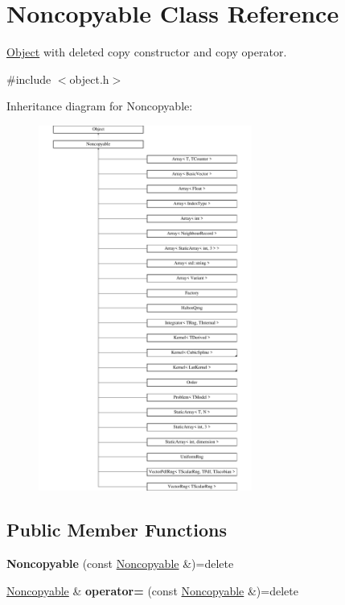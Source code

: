 \hypertarget{classNoncopyable}{}\section{Noncopyable Class Reference}
\label{classNoncopyable}


\hyperlink{classObject}{Object} with deleted copy constructor and copy operator.  




{\ttfamily \#include $<$object.\+h$>$}

Inheritance diagram for Noncopyable\+:\begin{figure}[H]
\begin{center}
\leavevmode
\includegraphics[height=12.000000cm]{classNoncopyable}
\end{center}
\end{figure}
\subsection*{Public Member Functions}
\begin{DoxyCompactItemize}
\item 
\hypertarget{classNoncopyable_a2ef4eb7cdf95677b046151206e10696b}{}\label{classNoncopyable_a2ef4eb7cdf95677b046151206e10696b} 
{\bfseries Noncopyable} (const \hyperlink{classNoncopyable}{Noncopyable} \&)=delete
\item 
\hypertarget{classNoncopyable_a09a0a26fe338b78dd3385142f07d5a25}{}\label{classNoncopyable_a09a0a26fe338b78dd3385142f07d5a25} 
\hyperlink{classNoncopyable}{Noncopyable} \& {\bfseries operator=} (const \hyperlink{classNoncopyable}{Noncopyable} \&)=delete
\end{DoxyCompactItemize}



